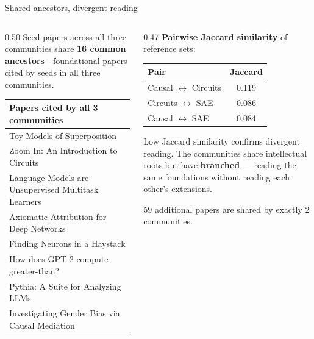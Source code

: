 \documentclass[aspectratio=169,11pt]{beamer}
\begin{document}
\begin{frame}[label=refoverlap]{Shared ancestors, divergent reading}
\begin{columns}[T]
\begin{column}{0.50\textwidth}
{\small Seed papers across all three communities share \textbf{16 common ancestors}---foundational papers cited by seeds in all three communities.}

\vspace{0.3em}
{\scriptsize
\begin{tabular}{l}
\toprule
\textbf{Papers cited by all 3 communities} \\
\midrule
Toy Models of Superposition \\
Zoom In: An Introduction to Circuits \\
Language Models are Unsupervised Multitask Learners \\
Axiomatic Attribution for Deep Networks \\
Finding Neurons in a Haystack \\
How does GPT-2 compute greater-than? \\
Pythia: A Suite for Analyzing LLMs \\
Investigating Gender Bias via Causal Mediation \\
\bottomrule
\end{tabular}
}
\end{column}
\begin{column}{0.47\textwidth}
\vspace{0.3em}
{\small \textbf{Pairwise Jaccard similarity} of reference sets:}

\vspace{0.5em}
\centering
{\scriptsize
\begin{tabular}{lc}
\toprule
\textbf{Pair} & \textbf{Jaccard} \\
\midrule
Causal $\leftrightarrow$ Circuits & 0.119 \\
Circuits $\leftrightarrow$ SAE & 0.086 \\
Causal $\leftrightarrow$ SAE & 0.084 \\
\bottomrule
\end{tabular}
}

\vspace{0.5em}
\raggedright
{\small Low Jaccard similarity confirms divergent reading. The communities share intellectual roots but have \textbf{branched} --- reading the same foundations without reading each other's extensions.}

\vspace{0.5em}
{\scriptsize 59 additional papers are shared by exactly 2 communities.}
\end{column}
\end{columns}
\end{frame}
\end{document}
